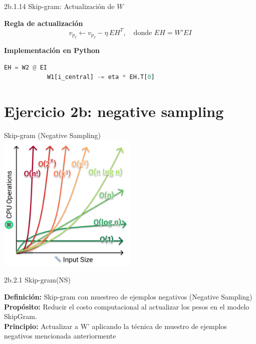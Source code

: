 \documentclass{beamer}
\begin{document}
\begin{frame}[fragile]{2b.1.14 Skip-gram: Actualización de $W$}
	\begin{block}{\textbf{Regla de actualización}}
		\[
		v_{p_I} \leftarrow v_{p_I} - \eta \, EH^T, 
		\quad \text{donde } EH = W' EI
		\]
	\end{block}
	
	\begin{block}{\textbf{Implementación en Python}}
		\begin{lstlisting}[language=Python]
			EH = W2 @ EI
			W1[i_central] -= eta * EH.T[0]
		\end{lstlisting}
	\end{block}
\end{frame}

\section{Ejercicio 2b: negative sampling}

\begin{frame}{}
	\centering
	\Large Skip-gram (Negative Sampling)\\
	\vspace{0.8cm}
	\includegraphics[width=0.5\textwidth]{big-o}
\end{frame}

\begin{frame}[fragile]{2b.2.1 Skip-gram(NS)}
	\begin{block}{\textbf{Definición:} Skip-gram con muestreo de ejemplos negativos (Negative Sampling)}
		\justifying
		\vspace{0.1cm}
		\textbf{Propósito:} Reducir el costo computacional al actualizar los pesos en el modelo SkipGram.\\
		\vspace{0.1cm}
		\textbf{Principio:} Actualizar a W' aplicando la técnica de muestro de ejemplos negativos mencionada anteriormente\\
	\end{block}
\end{frame}
\end{document}
